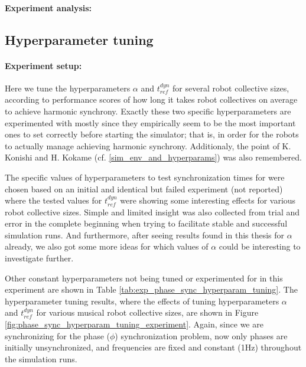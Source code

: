 		\paragraph{Experiment analysis:\nl}
	
	\subsection{Hyperparameter tuning}
	
		\paragraph{Experiment setup:\nl}
		
		Here we tune the hyperparameters $\alpha$ and $t_{ref}^{dyn}$ for several robot collective sizes, according to performance scores of how long it takes robot collectives on average to achieve harmonic synchrony. Exactly these two specific hyperparameters are experimented with mostly since they empirically seem to be the most important ones to set correctly before starting the simulator; that is, in order for the robots to actually manage achieving harmonic synchrony. Additionaly, the point of K. Konishi and H. Kokame (cf. \ref{sim_env_and_hyperparams}) was also remembered.
		
		The specific values of hyperparameters to test synchronization times for were chosen based on an initial and identical but failed experiment (not reported) where the tested values for $t_{ref}^{dyn}$ were showing some interesting effects for various robot collective sizes. Simple and limited insight was also collected from trial and error in the complete beginning when trying to facilitate stable and successful simulation runs. And furthermore, after seeing results found in this thesis for $\alpha$ already, we also got some more ideas for which values of $\alpha$ could be interesting to investigate further.
		
		Other constant hyperparameters not being tuned or experimented for in this experiment are shown in Table \ref{tab:exp_phase_sync_hyperparam_tuning}. The hyperparameter tuning results, where the effects of tuning hyperparameters $\alpha$ and $t_{ref}^{dyn}$ for various musical robot collective sizes, are shown in Figure \ref{fig:phase_sync_hyperparam_tuning_experiment}. Again, since we are synchronizing for the phase ($\phi$) synchronization problem, now only phases are initially unsynchronized, and frequencies are fixed and constant (1Hz) throughout the simulation runs.
		
